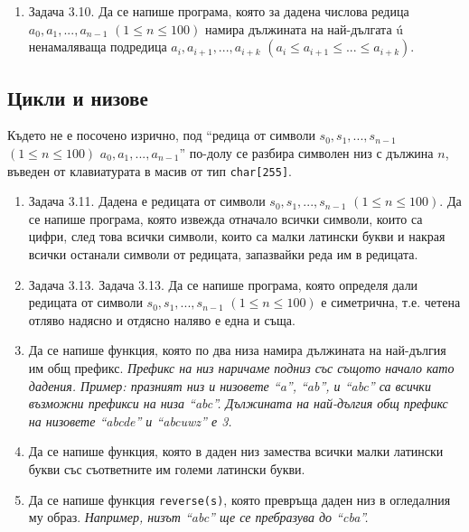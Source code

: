 \documentclass[12pt,a4paper]{article}
\newcommand{\code}[1]{\texttt{#1}}
\begin{document}
{\begin{enumerate}[]
		\item Задача 3.10. \cite{sbornik} Да се напише програма, която за дадена числова редица $a_0, a_1, ..., a_{n-1}$ $(1 \leq n \leq 100)$ намира дължината на най-дългата ú ненамаляваща подредица $a_i, a_{i+1}, ..., a_{i+k}$ $(a_i \leq a_{i+1} \leq ... \leq a_{i+k})$.


\end{enumerate}

\subsection {Цикли и низове}
Където не е посочено изрично, под ``редица от символи $s_0, s_1, ..., s_{n-1}$ $(1 \leq n \leq 100)$ $a_0, a_1, ..., a_{n-1}$'' по-долу се разбира символен низ с дължина $n$, въведен от клавиатурата в масив от тип \code{char[255]}.

\begin{enumerate}[resume]


  \item Задача 3.11. \cite{sbornik}	Дадена е редицата от символи $s_0, s_1, ..., s_{n-1}$ $(1 \leq n \leq 100)$. Да се напише програма, която извежда отначало всички символи, които са цифри, след това всички символи, които са малки латински букви и накрая всички останали символи от редицата, запазвайки реда им в редицата.

	\item Задача 3.13. \cite{sbornik} Задача 3.13. Да се напише програма, която определя дали редицата от символи $s_0, s_1, ..., s_{n-1}$ $(1 \leq n \leq 100)$ е симетрична, т.е. четена отляво надясно и отдясно наляво е една и съща.

  \item Да се напише функция, която по два низа намира дължината на най-дългия им общ префикс. \textit{Префикс на низ наричаме подниз със същото начало като дадения. Пример: празният низ и низовете ``a'', ``ab'', и ``abc'' са всички възможни префикси на низа ``abc''. Дължината на най-дългия общ префикс на низовете ``abcde'' и ``abcuwz'' е 3.}

  \item Да се напише функция, която в даден низ замества всички малки латински букви със съответните им големи латински букви.

  \item Да се напише функция \code{reverse(s)}, която превръща даден низ в огледалния му образ. \textit{Например, низът ``abc'' ще се пребразува до ``cba''.}


\end{enumerate}}
\end{document}
